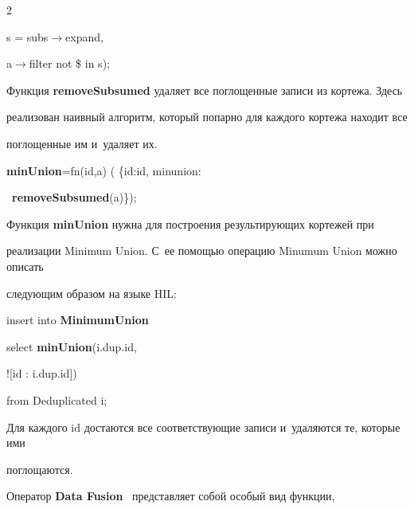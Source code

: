 \begin{multicols}{2}
{  s = subs\;$\to$\;expand,



\noindent

  a\;$\to$\;filter not \$ in s);

}



  Функция \textbf{removeSubsumed} удаляет все поглощенные записи из кортежа. Здесь

реализован наивный алгоритм, который попарно для каждого кортежа находит все

поглощенные им и~удаляет их.



{\sf

\noindent

{\textbf{minUnion}}\;=\;fn(id,a) ( \{id:id, minunion:





\noindent

\ {\textbf{removeSubsumed}}(a)\});

}



  Функция \textbf{minUnion} нужна для построения результирующих кортежей при

реализации Minimum Union. С~ее помощью операцию Minumum Union можно описать

следующим образом на языке HIL:



{\sf \noindent

  insert into {\textbf{MinimumUnion}}



\noindent

  select {\textbf{minUnion}}(i.dup.id,



\noindent

  ![id : i.dup.id])



\noindent

  from Deduplicated i;

  }



  Для каждого id достаются все соответствующие записи и~удаляются те, которые ими

поглощаются.



  Оператор \textbf{Data Fusion}~\cite{13-vov} представляет собой особый вид функции,


\end{multicols}
